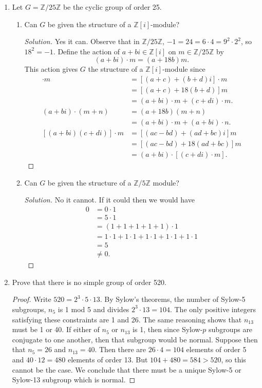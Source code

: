 \documentclass[11pt,letterpaper]{report}
\newcommand{\integers}{\mathbb{Z}}
\newenvironment{solution}
{\begin{proof}[Solution]}
{\end{proof}}
\begin{document}
\begin{enumerate}
	\item Let $G = \integers/25\integers$ be the cyclic group of order 25.
	\begin{enumerate}
		\item Can $G$ be given the structure of a $\integers[i]$-module?
		\begin{solution}
			Yes it can. Observe that in $\integers/25\integers$, $-1 = 24 = 6\cdot 4 = 9^2\cdot 2^2$, so $18^2 = -1$. Define the action of $a+bi\in \integers[i]$ on $m\in \integers/25\integers$ by 
			\[
			(a+bi)\cdot m = (a+18b)m.
			\]
			This action gives $G$ the structure of a $\integers[i]$-module since
			\begin{align*}
				[(a+bi)+(c+di)]\cdot m &= [(a+c)+(b+d)i]\cdot m\\
				&= [(a+c)+18(b+d)]m\\
				&= (a+bi)\cdot m + (c+di)\cdot m.\\
				(a+bi)\cdot (m+n) &= (a+18b)(m+n)\\
				&= (a+bi)\cdot m + (a+bi)\cdot n.\\
				[(a+bi)(c+di)]\cdot m&= [(ac-bd)+(ad+bc)i]m\\
				&= [(ac-bd)+18(ad+bc)]m\\
				&= (a+bi)\cdot [(c+di)\cdot m].
			\end{align*}
		\end{solution}
		\item Can $G$ be given the structure of a $\integers/5\integers$ module?
		\begin{solution}
			No it cannot. If it could then we would have
			\begin{align*}
				0 &= 0\cdot 1\\
				&= 5\cdot 1\\
				&= (1+1+1+1+1)\cdot 1\\
				&= 1\cdot 1 + 1\cdot 1 + 1\cdot 1+1\cdot 1 + 1\cdot 1\\
				&= 5\\
				&\neq 0.
			\end{align*}
		\end{solution}
	\end{enumerate}

	\item Prove that there is no simple group of order 520.
	\begin{proof}
		Write $520 = 2^3\cdot 5\cdot 13$. By Sylow's theorems, the number of Sylow-5 subgroups, $n_5$ is 1 mod 5 and divides $2^3\cdot 13 = 104$. The only positive integers satisfying these constraints are 1 and 26. The same reasoning shows that $n_{13}$ must be 1 or 40. If either of $n_5$ or $n_{13}$ is 1, then since Sylow-$p$ subgroups are conjugate to one another, then that subgroup would be normal. Suppose then that $n_5 = 26$ and $n_{13} = 40$. Then there are $26\cdot 4 = 104$ elements of order 5 and $40\cdot 12 = 480$ elements of order 13. But $104+480 = 584 > 520$, so this cannot be the case. We conclude that there must be a unique Sylow-5 or Sylow-13 subgroup which is normal.
	\end{proof}


\end{enumerate}
\end{document}
